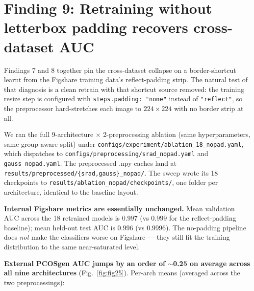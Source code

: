 \documentclass[11pt]{article}
\begin{document}
\clearpage

\section{Finding 9: Retraining without letterbox padding recovers cross-dataset AUC}
\label{sec:no-pad}

Findings 7 and 8 together pin the cross-dataset collapse on a
border-shortcut learnt from the Figshare training data's reflect-padding
strip. The natural test of that diagnosis is a clean retrain with that
shortcut source removed: the training resize step is configured with
\texttt{steps.padding: "none"} instead of \texttt{"reflect"}, so the
preprocessor hard-stretches each image to $224 \times 224$ with no
border strip at all.

We ran the full 9-architecture $\times$ 2-preprocessing ablation (same
hyperparameters, same group-aware split) under
\texttt{configs/experiment/ablation\_18\_nopad.yaml}, which dispatches
to \texttt{configs/preprocessing/srad\_nopad.yaml} and
\texttt{gauss\_nopad.yaml}. The preprocessed .npy caches land at
\texttt{results/preprocessed/\{srad,gauss\}\_nopad/}. The sweep wrote
its 18 checkpoints to \texttt{results/ablation\_nopad/checkpoints/},
one folder per architecture, identical to the baseline layout.

\textbf{Internal Figshare metrics are essentially unchanged.} Mean
validation AUC across the 18 retrained models is $0.997$ (vs $0.999$
for the reflect-padding baseline); mean held-out test AUC is $0.996$
(vs $0.9996$). The no-padding pipeline does \emph{not} make the
classifiers worse on Figshare — they still fit the training distribution
to the same near-saturated level.

\textbf{External PCOSgen AUC jumps by an order of $\sim$0.25 on average
across all nine architectures} (Fig.~\ref{fig:fig25}). Per-arch means
(averaged across the two preprocessings):
\end{document}
